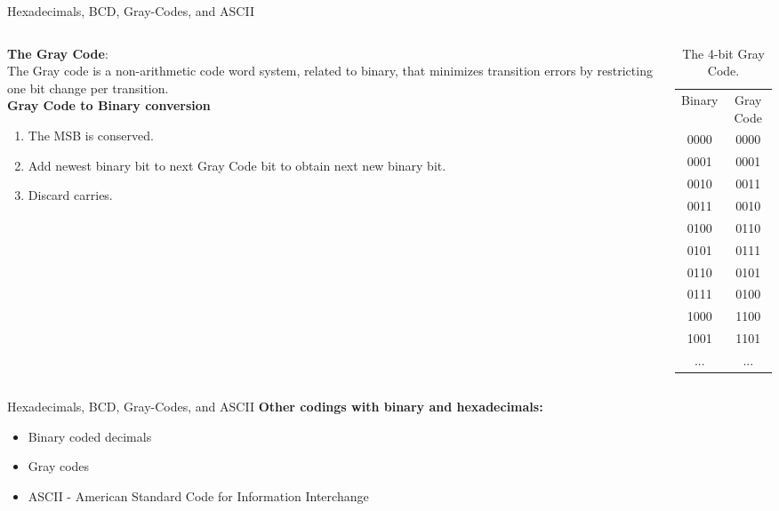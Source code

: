 \documentclass{beamer}
\begin{document}
\begin{frame}{Hexadecimals, BCD, Gray-Codes, and ASCII}
\small
\begin{columns}[T]
\begin{column}{0.5\textwidth}
\textbf{The Gray Code}: \\ \vspace{0.5cm}
The Gray code is a non-arithmetic code word system, related to binary, that minimizes transition errors by restricting one bit change per transition. \\ \vspace{0.5cm}
\textbf{Gray Code to Binary conversion}
\begin{enumerate}
\item The MSB is conserved.
\item Add newest binary bit to next Gray Code bit to obtain next new binary bit.
\item Discard carries.
\end{enumerate}
\end{column}
\begin{column}{0.5\textwidth}
\begin{table}
\centering
\begin{tabular}{c c}
Binary & Gray Code \\
0000 & 0000 \\
0001 & 0001 \\
0010 & 0011 \\
0011 & 0010 \\
0100 & 0110 \\
0101 & 0111 \\
0110 & 0101 \\
0111 & 0100 \\
1000 & 1100 \\
1001 & 1101 \\
... & ... 
\end{tabular}
\caption{\label{tab:grayCode} \small The 4-bit Gray Code.}
\end{table}
\end{column}
\end{columns}
\end{frame}

\begin{frame}{Hexadecimals, BCD, Gray-Codes, and ASCII}
\textbf{Other codings with binary and hexadecimals:}
\begin{itemize}
\item \alert{Binary coded decimals}
\item \alert{Gray codes}
\item ASCII - American Standard Code for Information Interchange
\end{itemize}
\end{frame}
\end{document}
